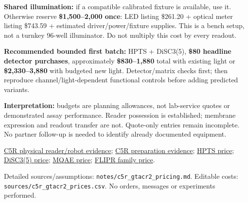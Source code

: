 \documentclass[10pt]{article}
\begin{document}
\textbf{Shared illumination:} if a compatible calibrated fixture is available, use it. Otherwise reserve \textbf{\$1,500--2,000 once}: LED listing \$261.20 + optical meter listing \$743.59 + estimated driver/power/fixture supplies. This is a bench setup, not a turnkey 96-well illuminator. Do not multiply this cost by every readout.

\textbf{Recommended bounded first batch:} HPTS + DiSC3(5), \textbf{\$80 headline detector purchases}, approximately \textbf{\$830--1,880} total with existing light or \textbf{\$2,330--3,880} with budgeted new light. Detector/matrix checks first; then reproduce channel/light-dependent functional controls before adding predicted variants.

\textbf{Interpretation:} budgets are planning allowances, not lab-service quotes or demonstrated assay performance. Reader possession is established; membrane expression and readout transfer are not. Quote-only entries remain incomplete. No partner follow-up is needed to identify already documented equipment.

\scriptsize
\href{https://c5r.net/sciuniverse/suites/pcr-recovery/}{C5R physical reader/robot evidence};
\href{https://c5r.net/sciuniverse/suites/cfps-sfgfp/}{C5R preparation evidence};
\href{https://www.abmole.com/products/8-hydroxypyrene-1-3-6-trisulfonic-acid.html}{HPTS price};
\href{https://www.apexbt.com/disc3-5.html}{DiSC3(5) price};
\href{https://www.dojindo.com/products/M024/}{MQAE price};
\href{https://shop.moleculardevices.com/collections/assay-kits/products/flipr-membrane-potential-assay-kit}{FLIPR family price}.
\par
Detailed sources/assumptions: \texttt{notes/c5r\_gtacr2\_pricing.md}. Editable costs: \texttt{sources/c5r\_gtacr2\_prices.csv}. No orders, messages or experiments performed.
\end{document}
